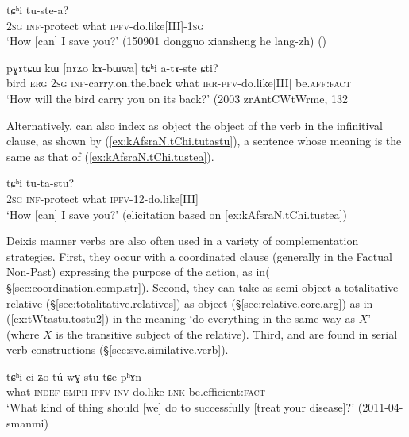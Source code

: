  \begin{exe}
\ex \label{ex:kAfsraN.tChi.tustea}
 tɕʰi tu-ste-a? \\
\textsc{2sg} \textsc{inf}-protect what \textsc{ipfv}-do.like[III]-\textsc{1sg} \\
\glt `How [can] I save you?' (150901 dongguo xiansheng he lang-zh)
()
\end{exe} 

 \begin{exe}
\ex \label{ex:kAbWwa.tChi.atAste}
\gll pɣɤtɕɯ kɯ [nɤʑo kɤ-bɯwa] tɕʰi a-tɤ-ste ɕti? \\
bird \textsc{erg} \textsc{2sg} \textsc{inf}-carry.on.the.back what \textsc{irr}-\textsc{pfv}-do.like[III] be.\textsc{aff}:\textsc{fact} \\
\glt `How will the bird carry you on its back?' (2003 zrAntCWtWrme, 132
\end{exe} 


Alternatively,  can also index as object the object of the verb in the infinitival clause, as shown by (\ref{ex:kAfsraN.tChi.tutastu}), a sentence whose meaning is the same as that of (\ref{ex:kAfsraN.tChi.tustea}).

 \begin{exe}
\ex \label{ex:kAfsraN.tChi.tutastu}
 tɕʰi tu-ta-stu? \\
\textsc{2sg} \textsc{inf}-protect what \textsc{ipfv}-1\fl{}2-do.like[III]  \\
\glt `How [can] I save you?' (elicitation based on \ref{ex:kAfsraN.tChi.tustea})
\end{exe} 

Deixis manner verbs are also often used in a variety of complementation strategies. First, they occur with a coordinated clause (generally in the Factual Non-Past) expressing the purpose of the action, as in( §\ref{sec:coordination.comp.str}). Second, they can take as semi-object a totalitative relative (§\ref{sec:totalitative.relatives}) as object (§\ref{sec:relative.core.arg}) as in (\ref{ex:tWtastu.tostu2}) in the meaning `do everything in the same way as $X$' (where $X$ is the transitive subject of the relative). Third,  and  are found in serial verb constructions (§\ref{sec:svc.similative.verb}).

 \begin{exe}
\ex \label{ex:tChi.tuwGstu}
\gll tɕʰi ci ʑo tú-wɣ-stu tɕe pʰɤn \\
what \textsc{indef} \textsc{emph} \textsc{ipfv}-\textsc{inv}-do.like \textsc{lnk} be.efficient:\textsc{fact} \\
\glt `What kind of thing should [we] do to successfully [treat your disease]?' (2011-04-smanmi)
\end{exe} 

